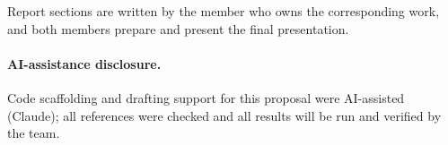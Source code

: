 \documentclass[11pt]{article}
\begin{document}
Report sections are written by the member who owns the corresponding work, and both members
prepare and present the final presentation.

\paragraph{AI-assistance disclosure.} Code scaffolding and drafting support for this
proposal were AI-assisted (Claude); all references were checked and all results will be
run and verified by the team.



\end{document}
